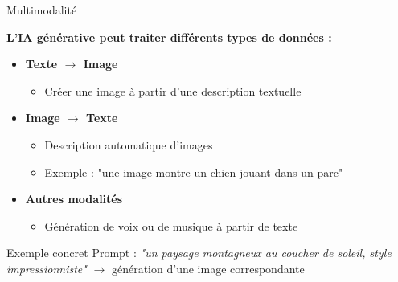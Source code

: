 \begin{frame}{Multimodalité}

\textbf{L'IA générative peut traiter différents types de données :}

\vspace{0.3cm}

\begin{itemize}
    \item<+-> \textbf{Texte $\rightarrow$ Image}
        \begin{itemize}
            \item Créer une image à partir d'une description textuelle
        \end{itemize}

    \vspace{0.2cm}
    \item<+-> \textbf{Image $\rightarrow$ Texte}
        \begin{itemize}
            \item Description automatique d'images
            \item Exemple : "une image montre un chien jouant dans un parc"
        \end{itemize}

    \vspace{0.2cm}
    \item<+-> \textbf{Autres modalités}
        \begin{itemize}
            \item Génération de voix ou de musique à partir de texte
        \end{itemize}
\end{itemize}

\vspace{0.3cm}

\begin{exampleblock}{Exemple concret}
Prompt : \textit{"un paysage montagneux au coucher de soleil, style impressionniste"} $\rightarrow$ génération d'une image correspondante
\end{exampleblock}

\end{frame}

